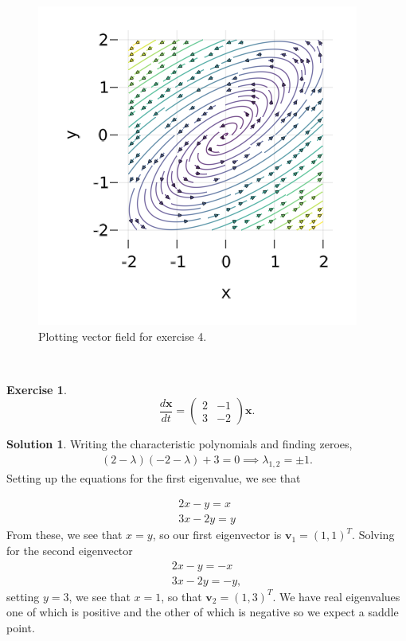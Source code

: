 \documentclass[12pt]{article}
\renewcommand{\vec}[1]{\mathbf{#1}}
\theoremstyle{definition}
\newtheorem{exer}{Exercise}
\newtheorem{sol}{Solution}
\theoremstyle{remark}
\begin{document}
  \begin{figure}[h]
     \centering
     \includegraphics[width=0.8\linewidth]{figs/hw-1-exer-4.png}
     \caption{Plotting vector field for exercise 4.}%
     \label{fig:exer-4}
 \end{figure}

\newpage


\

\newpage

\begin{exer}
\begin{equation*}
\frac{d \vec{x}}{dt} 
=
\begin{pmatrix}
    2 & -1\\
    3 & -2
\end{pmatrix}
\vec{x}.
\end{equation*}
\end{exer}

\begin{sol}\leavevmode
    Writing the characteristic polynomials and finding zeroes,
    \begin{align*}
        (2 - \lambda) ( - 2 - \lambda ) + 3 = 0 \implies \lambda_{1,2} = \pm 1.
    \end{align*}
    Setting up the equations for the first eigenvalue, we see that

    \begin{align*}
    2 x - y = x\\
    3x - 2y = y
    \end{align*}
    From these, we see that $x = y$, so our first eigenvector is $\vec{v}_{1} = (1, 1)^{T}$. Solving for the second eigenvector
    \begin{align*}
    2 x - y = -x\\
    3x - 2y = -y,
    \end{align*}
    setting $y = 3$, we see that $x = 1$, so that $\vec{v}_{2} = (1,3)^{T}$. We have real eigenvalues one of which is positive and the other of which is negative so we expect a saddle point.
 \end{sol}
\end{document}
